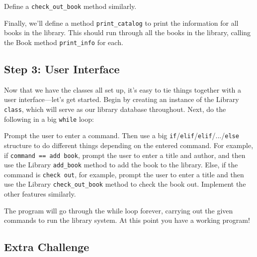 \documentclass{hitec}
\begin{document}
Define a \texttt{check\_out\_book} method similarly.

Finally, we'll define a method \texttt{print\_catalog} to print the information for all books in the library. This should run through all the books in the library, calling the Book method \texttt{print\_info} for each.

\subsection{Step 3: User Interface}

Now that we have the classes all set up, it's easy to tie things together with a user interface---let's get started.
Begin by creating an instance of the Library \texttt{class}, which will serve as our library database throughout. Next, do the following in a big \texttt{while} loop:

Prompt the user to enter a command. Then use a big \texttt{if}/\texttt{elif}/\texttt{elif}/.../\texttt{else} structure to do different things depending on the entered command. For example, if \texttt{command == \textquotesingle add book\textquotesingle}, prompt the user to enter a title and author, and then use the 
Library \texttt{add\_book} method to add the book to the library. Else, if the command is \texttt{\textquotesingle check out\textquotesingle}, for example, prompt the user to enter a title and then use the Library \texttt{check\_out\_book} method to check the book out. Implement the other features similarly. 

The program will go through the while loop forever, carrying out the given commands to run the library system. At this point you have a working program!

\subsection{Extra Challenge}
\end{document}
